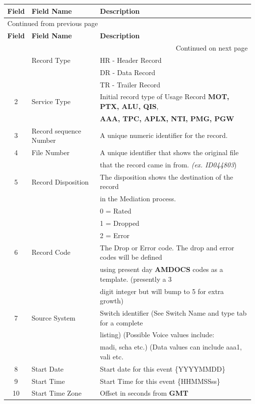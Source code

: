 \documentclass[12pt,twoside]{article}
\begin{document}
\begin{longtable}{c|l|l}
\hline
\textbf{Field} & \textbf{Field Name} & \textbf{Description}\\
\hline
\endfirsthead
\multicolumn{3}{l}{Continued from previous page} \\
\hline

\textbf{Field} & \textbf{Field Name} & \textbf{Description} \\

\hline
\endhead
\hline\multicolumn{3}{r}{Continued on next page} \\
\endfoot
\endlastfoot
\hline
1 & Record Type & HR - Header Record\\
 &  & DR - Data Record\\
 &  & TR - Trailer Record\\
2 & Service Type & Initial record type of Usage Record \textbf{MOT, PTX, ALU, QIS},\\
 &  & \textbf{AAA, TPC, APLX, NTI, PMG, PGW}\\
3 & Record sequence Number & A unique numeric identifier for the record.\\
4 & File Number & A unique identifier that shows the original file\\
 &  & that the record came in from. \emph{(ex. ID044803})\\
5 & Record Disposition & The disposition shows the destination of the record\\
 &  & in the Mediation process.\\
 &  & 0 = Rated\\
 &  & 1 = Dropped\\
 &  & 2 = Error\\
6 & Record Code & The Drop or Error code. The drop and error codes will be defined\\
 &  & using present day \textbf{AMDOCS} codes as a template. (presently a 3\\
 &  & digit integer but will bump to 5 for extra growth)\\
7 & Source System & Switch identifier (See Switch Name and type tab for a complete\\
 &  & listing) (Possible Voice values include:\\
 &  & madi, scha etc.) (Data values can include aaa1, vali etc.\\
8 & Start Date & Start date for this event \{YYYYMMDD\}\\
9 & Start Time & Start Time for this event \{HHMMSSss\}\\
10 & Start Time Zone & Offset in seconds from \textbf{GMT}\\

\end{longtable}
\end{document}
